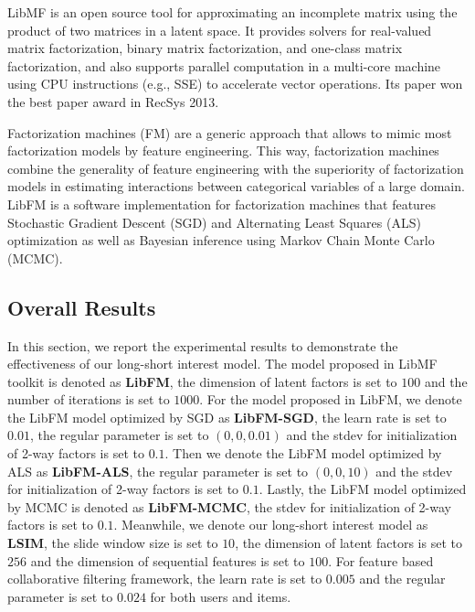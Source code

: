 \documentclass{llncs}
\begin{document}
LibMF is an open source tool for approximating an incomplete matrix
using the product of two matrices in a latent space.
It provides solvers for real-valued matrix factorization,
binary matrix factorization, and one-class matrix factorization, and 
also supports parallel computation in a multi-core machine using CPU
instructions (e.g., SSE) to accelerate vector operations.
Its paper \cite{chin2015fast} won the best paper award in RecSys 2013.

Factorization machines (FM) are a generic approach that
allows to mimic most factorization models by feature engineering.
This way, factorization machines combine the generality of
feature engineering with the superiority of factorization models
in estimating interactions between categorical variables of a large domain.
LibFM \cite{rendle2012factorization} is a software implementation
for factorization machines that features
Stochastic Gradient Descent (SGD) and
Alternating Least Squares (ALS) optimization as well as
Bayesian inference using Markov Chain Monte Carlo (MCMC).

\subsection{Overall Results}
In this section, we report the experimental results to demonstrate
the effectiveness of our long-short interest model.
The model proposed in LibMF toolkit is denoted as \textbf{LibFM},
the dimension of latent factors is set to $100$ and the number of
iterations is set to $1000$.
For the model proposed in LibFM, we denote the LibFM model optimized by
SGD as \textbf{LibFM-SGD}, the learn rate is set to $0.01$, the regular
parameter is set to $(0,0,0.01)$ and the stdev for initialization of 2-way
factors is set to $0.1$. Then we denote the LibFM model optimized by ALS
as \textbf{LibFM-ALS}, the regular parameter is set to $(0,0,10)$ and the
stdev for initialization of 2-way factors is set to $0.1$. Lastly, the
LibFM model optimized by MCMC is denoted as \textbf{LibFM-MCMC}, the stdev
for initialization of 2-way factors is set to $0.1$.
Meanwhile, we denote our long-short interest model as \textbf{LSIM},
the slide window size is set to $10$, the dimension of latent factors is
set to $256$ and the dimension of sequential features is set to $100$.
For feature based collaborative filtering framework, the learn rate is set
to $0.005$ and the regular parameter is set to $0.024$ for both users and items.
\end{document}
